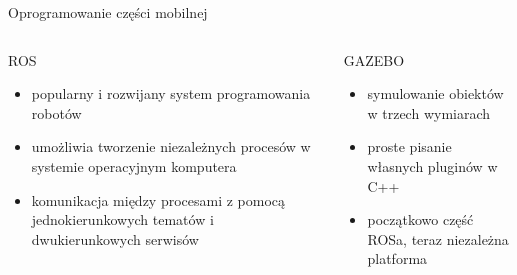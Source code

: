 \begin{frame}{Oprogramowanie części mobilnej}
	\begin{columns}
		\begin{column}{0.5\textwidth}
			\begin{center}
				ROS
			\end{center}
			\begin{itemize}
				\item popularny i rozwijany system programowania robotów
				\item umożliwia tworzenie niezależnych procesów w systemie operacyjnym komputera
				\item komunikacja między procesami z pomocą jednokierunkowych tematów i dwukierunkowych serwisów
			\end{itemize}
			
		\end{column}
		\begin{column}{0.5\textwidth}  %
			\begin{center}
				GAZEBO
			\end{center}
			\begin{itemize}
				\item symulowanie obiektów w trzech wymiarach
				\item proste pisanie własnych pluginów w C++
				\item początkowo część ROSa, teraz niezależna platforma
			\end{itemize}
		\end{column}
	\end{columns}
\end{frame}